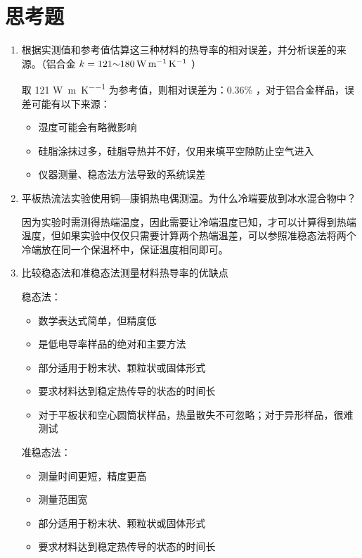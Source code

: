 \documentclass[a4paper,utf8]{article}
\newcommand{\TTR}[0]{\watt\per\m\per\K}
\begin{document}
\section{思考题}
    \begin{enumerate}
        \item 根据实测值和参考值估算这三种材料的热导率的相对误差，并分析误差的来源。（铝合金 $k=\qrange{121}{180}{\TTR}$ ）\par
        取 121 \unit{\TTR} 为参考值，则相对误差为：0.36\% ，对于铝合金样品，误差可能有以下来源：
        \begin{itemize}
            \item 湿度可能会有略微影响
            \item 硅脂涂抹过多，硅脂导热并不好，仅用来填平空隙防止空气进入
            \item 仪器测量、稳态法方法导致的系统误差
        \end{itemize}
        \item 平板热流法实验使用铜—康铜热电偶测温。为什么冷端要放到冰水混合物中？\par
        因为实验时需测得热端温度，因此需要让冷端温度已知，才可以计算得到热端温度，但如果实验中仅仅只需要计算两个热端温差，可以参照准稳态法将两个冷端放在同一个保温杯中，保证温度相同即可。
        \item 比较稳态法和准稳态法测量材料热导率的优缺点\par
            稳态法：
            \begin{itemize}
                \item 数学表达式简单，但精度低
                \item 是低电导率样品的绝对和主要方法
                \item 部分适用于粉末状、颗粒状或固体形式
                \item 要求材料达到稳定热传导的状态的时间长
                \item 对于平板状和空心圆筒状样品，热量散失不可忽略；对于异形样品，很难测试
            \end{itemize}\par
            准稳态法：
            \begin{itemize}
                \item 测量时间更短，精度更高
                \item 测量范围宽
                \item 部分适用于粉末状、颗粒状或固体形式
                \item 要求材料达到稳定热传导的状态的时间长

\end{itemize}
\end{enumerate}
\end{document}

